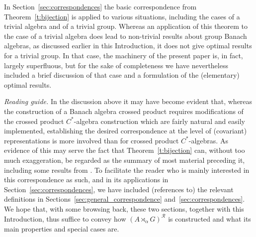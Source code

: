 \documentclass{amsart}
\theoremstyle{plain}
\theoremstyle{definition}
\numberwithin{equation}{section}
\begin{document}
In Section~\ref{sec:correspondences} the basic correspondence from Theorem~\ref{t:bijection} is applied to various situations, including the cases of a trivial algebra and of a trivial group. Whereas an application of this theorem to the case of a trivial algebra does lead to non-trivial results about group Banach algebras, as discussed earlier in this Introduction, it does not give optimal results for a trivial group. In that case, the machinery of the present paper is, in fact, largely superfluous, but for the sake of completeness we have nevertheless included a brief discussion of that case and a formulation of the (elementary) optimal results.

\medskip
\emph{Reading guide.} In the discussion above it may have become evident that, whereas the construction of a Banach algebra crossed product requires modifications of the crossed product $C^*$-algebra construction which are fairly natural and easily implemented, establishing the desired correspondence at the level of (covariant) representations is more involved than for crossed product $C^*$-algebras. As evidence of this may serve the fact that Theorem~\ref{t:bijection} can, without too much exaggeration, be regarded as the summary of most material preceding it, including some results from \cite{extendart}. To facilitate the reader who is mainly interested in this correspondence as such, and in its applications in Section~\ref{sec:correspondences}, we have included (references to) the relevant definitions in Sections~\ref{sec:general_correspondence} and~\ref{sec:correspondences}. We hope that, with some browsing back, these two sections, together with this Introduction, thus suffice to convey how ${(A {\rtimes}_\alpha G)^\mathcal{R}}$ is constructed and what its main properties and special cases are.
\end{document}
